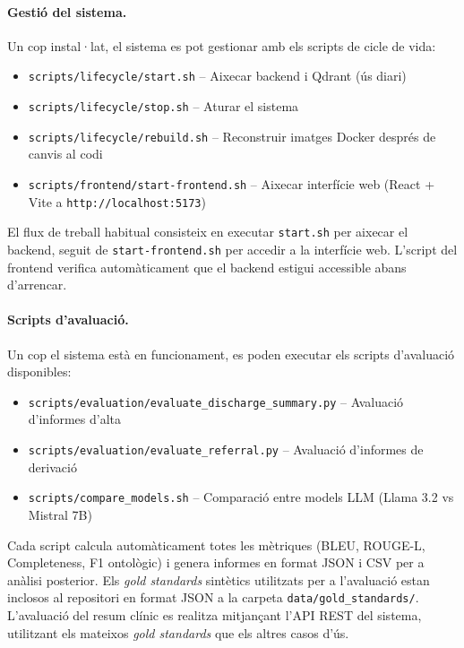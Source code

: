 \documentclass[CAT]{TFUOC}%
\begin{document}
\paragraph{Gestió del sistema.}
Un cop instal·lat, el sistema es pot gestionar amb els scripts de cicle de vida:
\begin{itemize}
    \item \texttt{scripts/lifecycle/start.sh} -- Aixecar backend i Qdrant (ús diari)
    \item \texttt{scripts/lifecycle/stop.sh} -- Aturar el sistema
    \item \texttt{scripts/lifecycle/rebuild.sh} -- Reconstruir imatges Docker després de canvis al codi
    \item \texttt{scripts/frontend/start-frontend.sh} -- Aixecar interfície web (React + Vite a \texttt{http://localhost:5173})
\end{itemize}

El flux de treball habitual consisteix en executar \texttt{start.sh} per aixecar el backend, seguit de \texttt{start-frontend.sh} per accedir a la interfície web. L'script del frontend verifica automàticament que el backend estigui accessible abans d'arrencar.

\paragraph{Scripts d'avaluació.}
Un cop el sistema està en funcionament, es poden executar els scripts d'avaluació disponibles:
\begin{itemize}
    \item \texttt{scripts/evaluation/evaluate\_discharge\_summary.py} -- Avaluació d'informes d'alta
    \item \texttt{scripts/evaluation/evaluate\_referral.py} -- Avaluació d'informes de derivació
    \item \texttt{scripts/compare\_models.sh} -- Comparació entre models LLM (Llama 3.2 vs Mistral 7B)
\end{itemize}

Cada script calcula automàticament totes les mètriques (BLEU, ROUGE-L, Completeness, F1 ontològic) i genera informes en format JSON i CSV per a anàlisi posterior. Els \textit{gold standards} sintètics utilitzats per a l'avaluació estan inclosos al repositori en format JSON a la carpeta \texttt{data/gold\_standards/}. L'avaluació del resum clínic es realitza mitjançant l'API REST del sistema, utilitzant els mateixos \textit{gold standards} que els altres casos d'ús.
\end{document}
